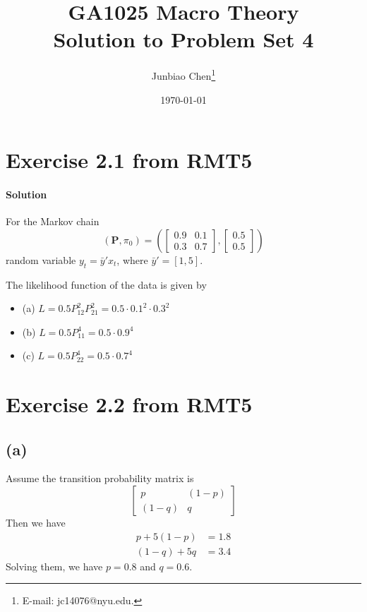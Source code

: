 \documentclass[11pt]{article}
\title{GA1025 Macro Theory \\Solution to Problem Set 4}
\author{
Junbiao Chen\thanks{E-mail: jc14076@nyu.edu.}
}
\date{\today}
\theoremstyle{definition}
\theoremstyle{boldtitle} %
\numberwithin{equation}{section}
\numberwithin{figure}{section}
\numberwithin{table}{section}
\begin{document}
\maketitle

\section*{Exercise 2.1 from RMT5}
\paragraph{Solution} 
For the Markov chain 
\[
(\mathbf{P}, \pi_0) = 
\left(\left[
\begin{matrix}
  0.9 &  0.1 \\ 0.3 &  0.7  
\end{matrix}
\right], 
\left[
\begin{matrix}
    0.5 \\ 0.5
\end{matrix}
\right]
\right)
\]
random variable $y_t = \bar{y}' x_t$, where $\bar{y}' = [1,5]$.

The likelihood function of the data is given by 
\begin{itemize}
    \item(a) $L = 0.5 P_{12}^2 P_{21}^2 = 0.5 \cdot 0.1^2 \cdot 0.3^2$
    \item(b) $L = 0.5 P_{11}^4 = 0.5 \cdot 0.9^4$
    \item(c) $L = 0.5 P_{22}^4 = 0.5 \cdot 0.7^4$
\end{itemize}

\section*{Exercise 2.2 from RMT5}
\subsection*{(a)} Assume the transition probability matrix is 
\[
\left[
\begin{matrix}
  p&  (1-p) \\ (1-q) &  q 
\end{matrix}
\right]
\]
Then we have 
\begin{align*}
    p + 5(1-p) & = 1.8 \\
    (1 - q) + 5q & = 3.4
\end{align*}
Solving them, we have $p = 0.8$ and $q = 0.6$.
\end{document}
